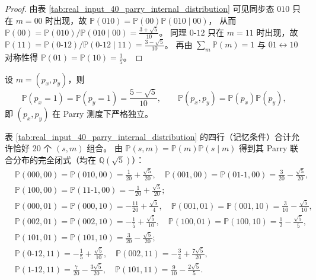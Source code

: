 \begin{proof}
由表 \ref{tab:real_input_40_parry_internal_distribution} 可见同步态 $010$ 只在 $m=00$ 时出现，故
\(
\mathbb{P}(010)=\mathbb{P}(00)\mathbb{P}(010\mid 00)
\)，
从而
\(
\mathbb{P}(00)=\mathbb{P}(010)/\mathbb{P}(010\mid 00)=\frac{3+\sqrt5}{10}
\)。
同理 $0$-$12$ 只在 $m=11$ 时出现，故
\(
\mathbb{P}(11)=\mathbb{P}(0\text{-}12)/\mathbb{P}(0\text{-}12\mid 11)=\frac{3-\sqrt5}{10}
\)。
再由 $\sum_m \mathbb{P}(m)=1$ 与 $01\leftrightarrow 10$ 对称性得 $\mathbb{P}(01)=\mathbb{P}(10)=\frac15$。
\end{proof}

\begin{corollary}\label{cor:real-input-40-memory-independence}
设 $m=(p_x,p_y)$，则
\[
\mathbb{P}(p_x=1)=\mathbb{P}(p_y=1)=\frac{5-\sqrt5}{10},
\qquad
\mathbb{P}(p_x,p_y)=\mathbb{P}(p_x)\mathbb{P}(p_y),
\]
即 $(p_x,p_y)$ 在 Parry 测度下严格独立。
\end{corollary}

\begin{remark}[本质 $20$ 状态核的全联合分布]\label{rem:real-input-40-parry-essential-20-joint}
表 \ref{tab:real_input_40_parry_internal_distribution} 的四行（记忆条件）合计允许恰好 $20$ 个 $(s,m)$ 组合。
由 $\mathbb{P}(s,m)=\mathbb{P}(m)\mathbb{P}(s\mid m)$ 得到其 Parry 联合分布的完全闭式（均在 $\mathbb{Q}(\sqrt5)$）：
\[
\begin{aligned}
&\mathbb{P}(000,00)=\mathbb{P}(010,00)=\frac{1}{20}+\frac{\sqrt5}{20},\quad
\mathbb{P}(001,00)=\mathbb{P}(01\text{-}1,00)=\frac{3}{20}-\frac{\sqrt5}{20},\\
&\mathbb{P}(100,00)=\mathbb{P}(11\text{-}1,00)=-\frac{1}{20}+\frac{\sqrt5}{20};\\[2pt]
&\mathbb{P}(000,01)=\mathbb{P}(000,10)=-\frac{11}{20}+\frac{\sqrt5}{4},\quad
\mathbb{P}(001,01)=\mathbb{P}(001,10)=\frac{3}{10}-\frac{\sqrt5}{10},\\
&\mathbb{P}(002,01)=\mathbb{P}(002,10)=-\frac15+\frac{\sqrt5}{10},\quad
\mathbb{P}(100,01)=\mathbb{P}(100,10)=\frac12-\frac{\sqrt5}{5},\\
&\mathbb{P}(101,01)=\mathbb{P}(101,10)=\frac{3}{20}-\frac{\sqrt5}{20};\\[2pt]
&\mathbb{P}(0\text{-}12,11)=-\frac15+\frac{\sqrt5}{10},\quad
\mathbb{P}(002,11)=-\frac34+\frac{7\sqrt5}{20},\\
&\mathbb{P}(1\text{-}12,11)=\frac7{20}-\frac{3\sqrt5}{20},\quad
\mathbb{P}(101,11)=\frac9{10}-\frac{2\sqrt5}{5}.
\end{aligned}
\]
\end{remark}

